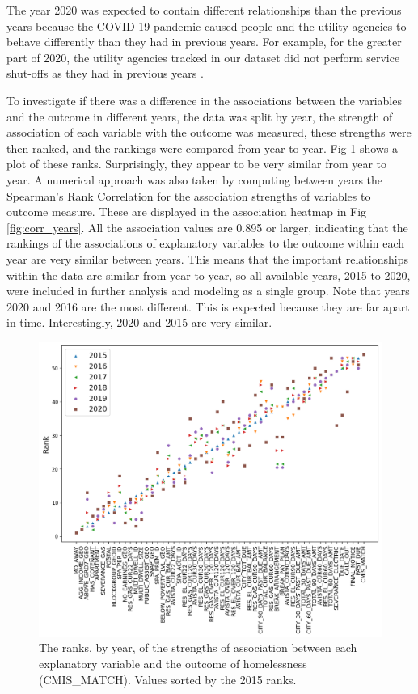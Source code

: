 \documentclass[10pt,letterpaper]{article}
\begin{document}
The year 2020 was expected to contain different relationships than the previous years because the COVID-19 pandemic caused people and the utility agencies to behave differently than they had in previous years. For example, for the greater part of 2020, the utility agencies tracked in our dataset did not perform service shut-offs as they had in previous years \cite{white2020utilities}. 

To investigate if there was a difference in the associations between the variables and the outcome in different years, the data was split by year, the strength of association of each variable with the outcome was measured, these strengths were then ranked, and the rankings were compared from year to year. Fig \ref{fig:corrRankByYear} shows a plot of these ranks. Surprisingly, they appear to be very similar from year to year. A numerical approach was also taken by computing between years the Spearman's Rank Correlation for the association strengths of variables to outcome measure. These are displayed in the association heatmap in Fig \ref{fig:corr_years}. All the association values are 0.895 or larger, indicating that the rankings of the associations of explanatory variables to the outcome within each year are very similar between years. This means that the important relationships within the data are similar from year to year, so all available years, 2015 to 2020, were included in further analysis and modeling as a single group. Note that years 2020 and 2016 are the most different. This is expected because they are far apart in time. Interestingly, 2020 and 2015 are very similar.

\begin{figure}[htb]
    \centering
    \includegraphics[width=\textwidth]{../img/corrRankByYear.png}
    \caption[Ranks of variable correlation by year]{The ranks, by year, of the strengths of association between each explanatory variable and the outcome of homelessness (CMIS\_MATCH). Values sorted by the 2015 ranks.}
    \label{fig:corrRankByYear}
\end{figure}
\end{document}
